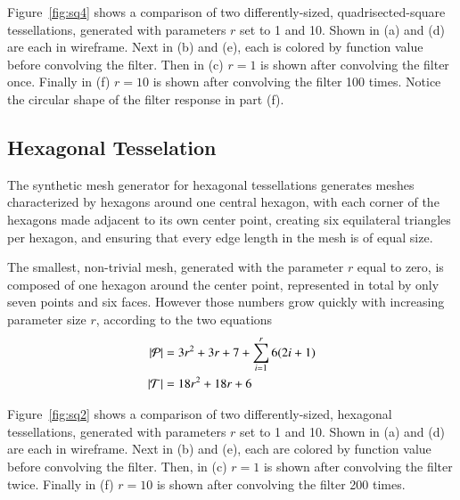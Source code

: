 Figure~\ref{fig:sq4} shows a comparison of two differently-sized, quadrisected-square tessellations, generated with parameters $r$ set to 1 and 10. Shown in (a) and (d) are each in wireframe. Next in (b) and (e), each is colored by function value before convolving the filter. Then in (c) $r=1$ is shown after convolving the filter once. Finally in (f) $r=10$ is shown after convolving the filter 100 times. Notice the circular shape of the filter response in part (f).



%
%
%
%
\pagebreak
\subsection{Hexagonal Tesselation}
\label{ch6sSTDDssHT}
The synthetic mesh generator for hexagonal tessellations generates meshes characterized by hexagons around one central hexagon, with each corner of the hexagons made adjacent to its own center point, creating six equilateral triangles per hexagon, and ensuring that every edge length in the mesh is of equal size.

The smallest, non-trivial mesh, generated with the parameter $r$ equal to zero, is composed of one hexagon around the center point, represented in total by only seven points and six faces. However those numbers grow quickly with increasing parameter size $r$, according to the two equations
\begin{align}
	|\mathcal{P}| &= 3r^2 + 3r + 7 +\sum_{i=1}^r{6(2i + 1)}\\
	|\mathcal{T}| &= 18r^2 + 18r + 6
	\label{eq:hexPointAndFaceCounts}
\end{align}

Figure~\ref{fig:sq2} shows a comparison of two differently-sized, hexagonal tessellations, generated with parameters $r$ set to 1 and 10. Shown in (a) and (d) are each in wireframe. Next in (b) and (e), each are colored by function value before convolving the filter. Then, in (c) $r=1$ is shown after convolving the filter twice. Finally in (f) $r=10$ is shown after convolving the filter 200 times.



%
%
%
%
\pagebreak
